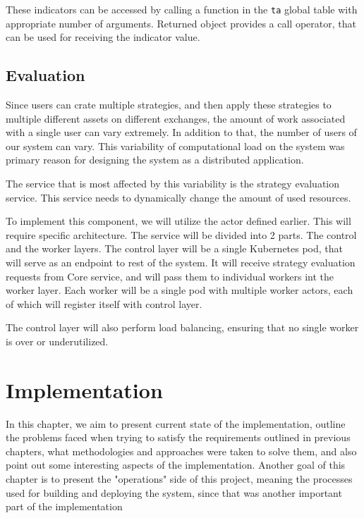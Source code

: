 These indicators can be accessed by calling a function in the \verb|ta| global table with appropriate number of arguments.
Returned object provides a call operator, that can be used for receiving the indicator value.



\section{Evaluation}
Since users can crate multiple strategies, and then apply these strategies to multiple different assets on different exchanges,
the amount of work associated with a single user can vary extremely. In addition to that, the number of users of our system can vary.
This variability of computational load on the system was primary reason for designing the system as a distributed application.

The service that is most affected by this variability is the strategy evaluation service. This service needs to
dynamically change the amount of used resources.


To implement this component, we will utilize the  actor defined earlier.
This will require specific architecture. The service will be divided into 2 parts. The control and the worker layers.
The control layer will be a single Kubernetes pod, that will serve as an endpoint to rest of the system. It will receive
strategy evaluation requests from Core service, and will pass them to individual workers int the worker layer.
Each worker will be a single pod with multiple worker actors, each of which will register itself with control layer.

The control layer will also perform load balancing, ensuring that no single worker is over or underutilized.

\chapter{Implementation}

In this chapter, we aim to present current state of the implementation, outline the problems faced when trying to satisfy the
requirements outlined in previous chapters, what methodologies and approaches were taken to solve them, and also
point out some interesting aspects of the implementation. Another goal of this chapter is to present the "operations"
side of this project, meaning the processes used for building and deploying the system, since that was another
important part of the implementation

